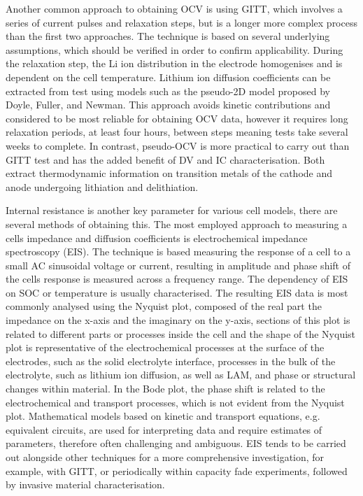 \documentclass[journal=jacsat,manuscript=article]{achemso}
\begin{document}
Another common approach to obtaining OCV is using GITT, which involves a series of current pulses and relaxation steps, but is a longer more complex process than the first two approaches.\cite{Dees2009} The technique is based on several underlying assumptions, which should be verified in order to confirm applicability.\cite{Dees2009} During the relaxation step, the Li ion distribution in the electrode homogenises and is dependent on the cell temperature. Lithium ion diffusion coefficients can be extracted from test using models such as the pseudo-2D model proposed by Doyle, Fuller, and Newman. \cite{Doyle1993DFN} This approach avoids kinetic contributions and considered to be most reliable for obtaining OCV data, however it requires long relaxation periods, at least four hours, between steps meaning tests take several weeks to complete. In contrast, pseudo-OCV is more practical to carry out than GITT test and has the added benefit of DV and IC characterisation. Both extract thermodynamic information on transition metals of the cathode and anode undergoing lithiation and delithiation.

Internal resistance is another key parameter for various cell models, there are several methods of obtaining this. The most employed approach to measuring a cells impedance and diffusion coefficients is electrochemical impedance spectroscopy (EIS). The technique is based measuring the response of a cell to a small AC sinusoidal voltage or current, resulting in amplitude and phase shift of the cells response is measured across a frequency range. The dependency of EIS on SOC or temperature is usually characterised.\cite{Andre2011} The resulting EIS data is most commonly analysed using the Nyquist plot, composed of the real part the impedance on the x-axis and the imaginary on the y-axis, sections of this plot is related to different parts or processes inside the cell and the shape of the Nyquist plot is representative of the electrochemical processes at the surface of the electrodes, such as the solid electrolyte interface, processes in the bulk of the electrolyte, such as lithium ion diffusion, as well as LAM, and phase or structural changes within material.\cite{Jalkanen2015, Andre2011} 
In the Bode plot, the phase shift is related to the electrochemical and transport processes, which is not evident from the Nyquist plot. Mathematical models based on kinetic and transport equations, e.g. equivalent circuits, are used for interpreting data and require estimates of parameters, therefore often challenging and ambiguous. EIS tends to be carried out alongside other techniques for a more comprehensive investigation, for example, with GITT, or periodically within capacity fade experiments, followed by invasive material characterisation. \cite{Jalkanen2015}
\end{document}
